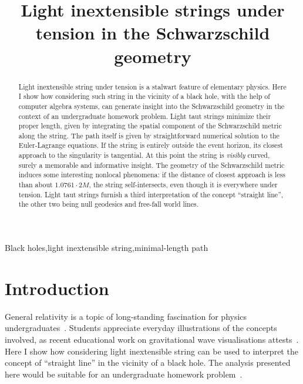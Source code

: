 \documentclass[review]{elsarticle}
\begin{document}
\begin{frontmatter}
\title{Light inextensible strings under tension in the Schwarzschild geometry}

\begin{abstract}

Light inextensible string under tension is a stalwart feature of
elementary physics.  Here I show how considering such string in the
vicinity of a black hole, with the help of computer algebra systems,
can generate insight into the Schwarzschild geometry in the context of
an undergraduate homework problem.  Light taut strings minimize their
proper length, given by integrating the spatial component of the
Schwarzschild metric along the string.  The path itself is given by
straightforward numerical solution to the Euler-Lagrange equations.
If the string is entirely outside the event horizon, its closest
approach to the singularity is tangential.  At this point the string
is {\em visibly} curved, surely a memorable and informative insight.
The geometry of the Schwarzschild metric induces some interesting
nonlocal phenomena: if the distance of closest approach is less than
about $1.0761\cdot 2M$, the string self-intersects, even though it is
everywhere under tension.  Light taut strings furnish a third
interpretation of the concept ``straight line'', the other two being
null geodesics and free-fall world lines.


\end{abstract}

\begin{keyword}
Black holes\sep light inextensible string\sep minimal-length path
\end{keyword}

\end{frontmatter}

\linenumbers
\section{Introduction}

General relativity is a topic of long-standing fascination for physics
undergraduates~\cite{christensen2012}.  Students appreciate everyday
illustrations of the concepts involved, as recent educational work on
gravitational wave visualisations attests~\cite{overduin2018}.  Here I
show how considering light inextensible string can be used to
interpret the concept of ``straight line'' in the vicinity of a black
hole.  The analysis presented here would be suitable for an
undergraduate homework problem~\cite{romano2019}.
\end{document}
